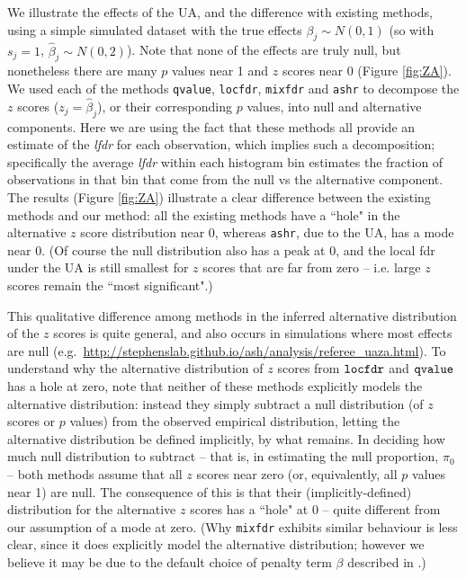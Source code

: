 \documentclass[11pt]{article}
\def\lfdr{\textit{lfdr}}
\def\bhat{\hat{\beta}}
\def\qvalue{{\tt qvalue}\xspace}
\def\locfdr{{\tt locfdr}\xspace}
\def\mixfdr{{\tt mixfdr}\xspace}
\def\ashr{{\tt ashr}\xspace}
\begin{document}
We illustrate the effects of the UA, and the difference with existing methods, using a simple simulated dataset
 with the true effects $\beta_j \sim N(0,1)$ (so with $s_j=1$, $\bhat_j  \sim N(0,2)$). Note that none of the effects are truly null,
but nonetheless there are many $p$ values near 1 and $z$ scores near 0 (Figure \ref{fig:ZA}).  We used each of the methods
\qvalue, \locfdr, \mixfdr and \ashr to decompose the $z$ scores ($z_j = \bhat_j$), or their corresponding $p$ values, into null and alternative components.
Here we are using the fact that these methods all provide an estimate of the \lfdr{} for each observation, which
implies such a decomposition;  specifically the average \lfdr{} within each histogram bin estimates the fraction of observations in that bin that come from the null vs the alternative component. The results (Figure \ref{fig:ZA}) illustrate a clear difference between the existing methods and our method:
all the existing methods have a ``hole"  in the alternative $z$ score distribution near 0, whereas \ashr, due to the UA, has a mode near 0.
(Of course the null distribution also has a peak at 0, and the local fdr 
 under the UA is still smallest for $z$ scores that are far from zero -- i.e. large $z$ scores remain the ``most significant".)
 
This qualitative difference among methods in the inferred alternative distribution of the $z$ scores is quite general, and 
also occurs in simulations where most effects are null (e.g.~\url{http://stephenslab.github.io/ash/analysis/referee_uaza.html}). To understand why the alternative distribution of $z$ scores from $\locfdr$ and $\qvalue$ has a hole at zero, note that neither
of these methods explicitly models the alternative distribution: instead they simply subtract a null distribution (of $z$ scores or $p$ values) from the observed empirical distribution, letting the alternative
distribution be defined implicitly, by what remains.
 In deciding how much null distribution to subtract -- that is, in estimating the null proportion, $\pi_0$ -- 
 both methods assume that all $z$ scores near zero (or, equivalently,
all $p$ values near 1) are null. The consequence of this is that their (implicitly-defined) distribution for the alternative $z$ scores has 
a ``hole" at 0 -- quite different from our assumption of a mode at zero. (Why \mixfdr exhibits similar behaviour is less clear, since it does explicitly
model the alternative distribution; however we believe it may be due to the default choice of penalty term $\beta$ described in \cite{muralidharan2010empirical}.)
\end{document}
